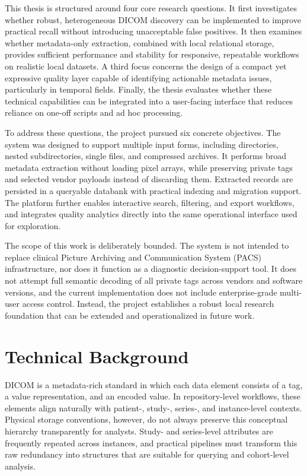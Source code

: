 This thesis is structured around four core research questions. It first investigates whether robust, heterogeneous DICOM discovery can be implemented to improve practical recall without introducing unacceptable false positives. It then examines whether metadata-only extraction, combined with local relational storage, provides sufficient performance and stability for responsive, repeatable workflows on realistic local datasets. A third focus concerns the design of a compact yet expressive quality layer capable of identifying actionable metadata issues, particularly in temporal fields. Finally, the thesis evaluates whether these technical capabilities can be integrated into a user-facing interface that reduces reliance on one-off scripts and ad hoc processing.

To address these questions, the project pursued six concrete objectives. The system was designed to support multiple input forms, including directories, nested subdirectories, single files, and compressed archives. It performs broad metadata extraction without loading pixel arrays, while preserving private tags and selected vendor payloads instead of discarding them. Extracted records are persisted in a queryable databank with practical indexing and migration support. The platform further enables interactive search, filtering, and export workflows, and integrates quality analytics directly into the same operational interface used for exploration.

The scope of this work is deliberately bounded. The system is not intended to replace clinical Picture Archiving and Communication System (PACS) infrastructure, nor does it function as a diagnostic decision-support tool. It does not attempt full semantic decoding of all private tags across vendors and software versions, and the current implementation does not include enterprise-grade multi-user access control. Instead, the project establishes a robust local research foundation that can be extended and operationalized in future work.

\section{Technical Background}
DICOM is a metadata-rich standard in which each data element consists of a tag, a value representation, and an encoded value\cite{dicom}. In repository-level workflows, these elements align naturally with patient-, study-, series-, and instance-level contexts. Physical storage conventions, however, do not always preserve this conceptual hierarchy transparently for analysts. Study- and series-level attributes are frequently repeated across instances, and practical pipelines must transform this raw redundancy into structures that are suitable for querying and cohort-level analysis.

